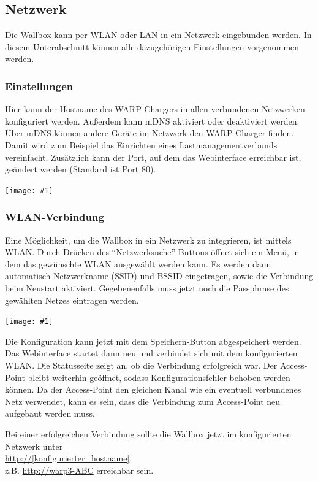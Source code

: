 \documentclass[a4paper,10pt]{article}
\newcommand{\gfx}[1]{\texttt{[image: \#1]}}
\begin{document}
\begin{multicols*}{2}
    \subsection{Netzwerk}\label{network}
    Die Wallbox kann per WLAN oder LAN in ein Netzwerk eingebunden werden.
    In diesem Unterabschnitt können alle dazugehörigen Einstellungen vorgenommen werden.

    \subsubsection{Einstellungen}
    Hier kann der Hostname des WARP Chargers in allen verbundenen Netzwerken konfiguriert werden. Außerdem kann mDNS aktiviert oder deaktiviert werden.
    Über mDNS können andere Geräte im Netzwerk den WARP Charger finden. Damit
    wird zum Beispiel das Einrichten eines Lastmanagementverbunds vereinfacht.
    Zusätzlich kann der Port, auf dem das Webinterface erreichbar ist, geändert werden (Standard ist
    Port 80).

    \gfx{./img_warp3/resized/web_network}


    \subsubsection{WLAN-Verbindung}
    Eine Möglichkeit, um die Wallbox in ein Netzwerk zu integrieren, ist mittels WLAN.
    Durch Drücken des \enquote{Netzwerksuche}-Buttons öffnet sich ein Menü, in dem das gewünschte WLAN ausgewählt werden kann.
    Es werden dann automatisch Netzwerkname (SSID) und BSSID eingetragen, sowie die Verbindung beim Neustart aktiviert.
    Gegebenenfalls muss jetzt noch die Passphrase des gewählten Netzes eintragen
	werden.

    \gfx{./img_warp3/resized/web_wifi_sta}

    Die Konfiguration kann jetzt mit dem Speichern-Button abgespeichert werden.
    Das Webinterface startet dann neu und verbindet sich mit dem konfigurierten WLAN. Die Statusseite zeigt
    an, ob die Verbindung erfolgreich war. Der Access-Point bleibt weiterhin
    geöffnet, sodass Konfigurationsfehler behoben werden können.
    Da der Access-Point den gleichen Kanal wie ein eventuell verbundenes Netz verwendet,
    kann es sein, dass die Verbindung zum Access-Point neu aufgebaut werden muss.

    Bei einer erfolgreichen Verbindung sollte die Wallbox jetzt im konfigurierten Netzwerk unter\\
    \url{http://[konfigurierter_hostname]},\\ z.B. \url{http://warp3-ABC} erreichbar sein.


\end{multicols*}
\end{document}

